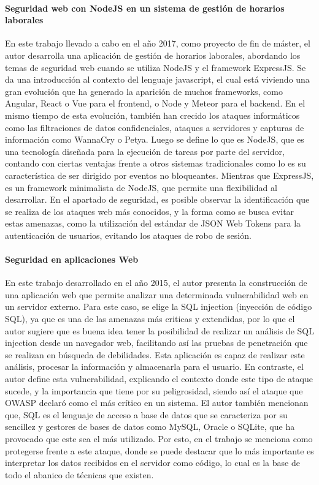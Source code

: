 \paragraph{Seguridad web con NodeJS en un sistema de gestión de horarios laborales \cite{JorgeLascorz}}
En este trabajo llevado a cabo en el año 2017, como proyecto de fin de máster, el autor desarrolla una aplicación de gestión de horarios laborales, abordando los temas de seguridad web cuando se utiliza NodeJS y el framework ExpressJS. 
Se da una introducción al contexto del lenguaje javascript, el cual está viviendo una gran evolución que ha generado la aparición de muchos frameworks, como Angular, React o Vue para el frontend, o Node y Meteor para el backend. En el mismo tiempo de esta evolución, también han crecido los ataques informáticos como las filtraciones de datos confidenciales, ataques a servidores y capturas de información como WannaCry o Petya.
Luego se define lo que es NodeJS, que es una tecnología diseñada para la ejecución de tareas por parte del servidor, contando con ciertas ventajas frente a otros sistemas tradicionales como lo es su característica de ser dirigido por eventos no bloqueantes. Mientras que ExpressJS, es un framework minimalista de NodeJS, que permite una flexibilidad al desarrollar.
En el apartado de seguridad, es posible observar la identificación que se realiza de los ataques web más conocidos, y la forma como se busca evitar estas amenazas, como la utilización del estándar de JSON Web Tokens para la autenticación de usuarios, evitando los ataques de robo de sesión.

\paragraph{ Seguridad en aplicaciones Web \cite{DiegoLosada}}
En este trabajo desarrollado en el año 2015, el autor presenta la construcción de una aplicación web que permite analizar una determinada vulnerabilidad web en un servidor externo. Para este caso, se elige la SQL injection (inyección de código SQL), ya que es una de las amenazas más criticas y extendidas, por lo que el autor sugiere que es buena idea tener la posibilidad de realizar un análisis de SQL injection desde un navegador web, facilitando así las pruebas de penetración que se realizan en búsqueda de debilidades. Esta aplicación es capaz de realizar este análisis, procesar la información y almacenarla para el usuario. En contraste, el autor define esta vulnerabilidad, explicando el contexto donde este tipo de ataque sucede, y la importancia que tiene por su peligrosidad, siendo así el ataque que OWASP declaró como el más crítico en un sistema. El autor también mencionan que, SQL es el lenguaje de acceso a base de datos que se caracteriza por su sencillez y gestores de bases de datos como MySQL, Oracle o SQLite, que ha provocado que este sea el más utilizado. Por esto, en el trabajo se menciona como protegerse frente a este ataque, donde se puede destacar que lo más importante es interpretar los datos recibidos en el servidor como código, lo cual es la base de todo el abanico de técnicas que existen. 



